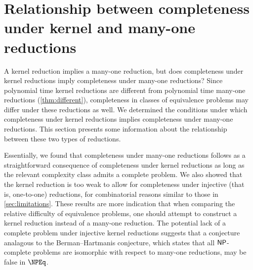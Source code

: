 \section
    [Relationship between completeness under kernel and many-one reductions]
    {Relationship between completeness \\ under kernel and many-one reductions}
\label{sec:npeqcompleteness}
%
A kernel reduction implies a many-one reduction, but does completeness under kernel reductions imply completeness under many-one reductions?
Since polynomial time kernel reductions are different from polynomial time many-one reductions (\autoref{thm:different}), completeness in classes of equivalence problems may differ under these reductions as well.
We determined the conditions under which completeness under kernel reductions implies completeness under many-one reductions.
This section presents some information about the relationship between these two types of reductions.

%
Essentially, we found that completeness under many-one reductions follows as a straightforward consequence of completeness under kernel reductions as long as the relevant complexity class admits a complete problem.
We also showed that the kernel reduction is too weak to allow for completeness under injective (that is, one-to-one) reductions, for combinatorial reasons similar to those in \autoref{sec:limitations}.
These results are more indication that when comparing the relative difficulty of equivalence problems, one should attempt to construct a kernel reduction instead of a many-one reduction.
The potential lack of a complete problem under injective kernel reductions suggests that a conjecture analagous to the Berman--Hartmanis conjecture, which states that all ${\mathsf{NP}}$-complete problems are isomorphic with respect to many-one reductions, may be false in $\NPEq$.

